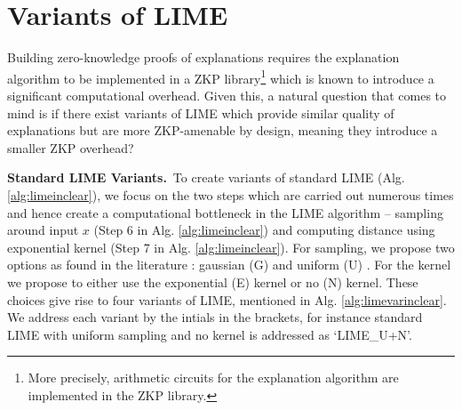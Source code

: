 \section{Variants of LIME}\label{sec:varlime}


Building zero-knowledge proofs of explanations requires the explanation algorithm to be implemented in a ZKP library\footnote{More precisely, arithmetic circuits for the explanation algorithm are implemented in the ZKP library.} which is known to introduce a significant computational overhead. Given this, a natural question that comes to mind is if there exist variants of LIME which provide similar quality of explanations but are more ZKP-amenable by design, meaning they introduce a smaller ZKP overhead?

\textbf{Standard LIME Variants.}~To create variants of standard LIME (Alg.\ref{alg:limeinclear}), we focus on the two steps which are carried out numerous times and hence create a computational bottleneck in the LIME algorithm -- sampling around input $x$ (Step 6 in Alg. \ref{alg:limeinclear}) and computing distance using exponential kernel (Step 7 in Alg. \ref{alg:limeinclear}). For sampling, we propose two options as found in the literature : gaussian (G) and uniform (U)  \cite{ribeiro2016should, garreau2020explaining, garreau2020looking}. For the kernel we propose to either use the exponential (E) kernel or no (N) kernel. These choices give rise to four variants of LIME, mentioned in Alg. \ref{alg:limevarinclear}. We address each variant by the intials in the brackets, for instance standard LIME with uniform sampling and no kernel is addressed as `LIME\_U+N'.



